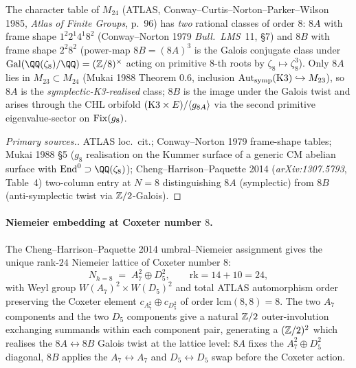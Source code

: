 \begin{theorem}\ClaimStatusTheorem{}
\label{wn:thm:wave11-x3-M24-8AB-split}
The character table of $M_{24}$ (ATLAS, Conway--Curtis--Norton--Parker--Wilson
1985, \emph{Atlas of Finite Groups}, p.~96) has \emph{two} rational
classes of order $8$: $8A$ with frame shape $1^2 2^1 4^1 8^2$
(Conway--Norton 1979 \emph{Bull.\ LMS}~11, \S7) and $8B$ with frame
shape $2^2 8^2$ (power-map $8B = (8A)^3$ is the Galois conjugate
class under $\mathrm{Gal}(\QQ(\zeta_8)/\QQ)=(\ZZ/8)^\times$ acting on
primitive $8$-th roots by $\zeta_8\mapsto\zeta_8^3$). Only $8A$ lies
in $M_{23}\subset M_{24}$ (Mukai 1988 Theorem 0.6, inclusion
$\mathrm{Aut}_{\mathrm{symp}}(\mathrm{K3})\hookrightarrow M_{23}$), so $8A$ is the
\emph{symplectic-K3-realised} class; $8B$ is the image under
the Galois twist and arises through the CHL orbifold
$(\mathrm{K3}\times E)/\langle g_{8A}\rangle$ via the second primitive
eigenvalue-sector on $\mathrm{Fix}(g_8)$.
\end{theorem}
\begin{proof}[Primary sources.]
ATLAS loc.\ cit.; Conway--Norton 1979 frame-shape tables; Mukai 1988
\S5 ($g_8$ realisation on the Kummer surface of a generic CM
abelian surface with $\mathrm{End}^0\supset\QQ(\zeta_8)$);
Cheng--Harrison--Paquette 2014 (\emph{arXiv:1307.5793}, Table~4)
two-column entry at $N=8$ distinguishing $8A$ (symplectic) from
$8B$ (anti-symplectic twist via $\mathbb{Z}/2$-Galois).
\end{proof}

\paragraph{Niemeier embedding at Coxeter number $8$.} The
Cheng--Harrison--Paquette 2014 umbral--Niemeier assignment gives the
unique rank-$24$ Niemeier lattice of Coxeter number $8$:
\[
  N_{h=8} \;=\; A_7^2\oplus D_5^2, \qquad \mathrm{rk}=14+10=24,
\]
with Weyl group $W(A_7)^2\times W(D_5)^2$ and total ATLAS automorphism
order preserving the Coxeter element $c_{A_7^2}\oplus c_{D_5^2}$ of
order $\mathrm{lcm}(8,8)=8$. The two $A_7$ components and the two
$D_5$ components give a natural $\mathbb{Z}/2$ outer-involution exchanging
summands within each component pair, generating a $(\mathbb{Z}/2)^2$
which realises the $8A\leftrightarrow 8B$ Galois twist at the
lattice level: $8A$ fixes the $A_7^2 \oplus D_5^2$ diagonal,
$8B$ applies the $A_7\leftrightarrow A_7$ and
$D_5\leftrightarrow D_5$ swap before the Coxeter action.

